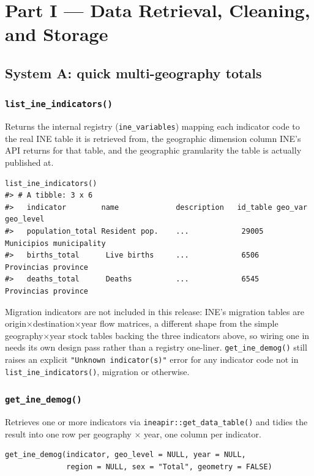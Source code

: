 \documentclass[11pt]{article}
\newcommand{\fn}[1]{\texttt{#1}}
\begin{document}
\newpage
\section{Part I --- Data Retrieval, Cleaning, and Storage}
\label{sec:part1}

\subsection{System A: quick multi-geography totals}

\subsubsection{\fn{list\_ine\_indicators()}}

Returns the internal registry (\fn{ine\_variables}) mapping each indicator
code to the real INE table it is retrieved from, the geographic dimension
column INE's API returns for that table, and the geographic granularity the
table is actually published at.

\begin{lstlisting}
list_ine_indicators()
#> # A tibble: 3 x 6
#>   indicator        name             description   id_table geo_var geo_level
#>   population_total Resident pop.    ...            29005    Municipios municipality
#>   births_total      Live births     ...            6506     Provincias province
#>   deaths_total      Deaths          ...            6545     Provincias province
\end{lstlisting}

Migration indicators are not included in this release: INE's migration
tables are origin$\times$destination$\times$year flow matrices, a different
shape from the simple geography$\times$year stock tables backing the three
indicators above, so wiring one in needs its own design pass rather than a
registry one-liner. \fn{get\_ine\_demog()} still raises an explicit
\fn{"Unknown indicator(s)"} error for any indicator code not in
\fn{list\_ine\_indicators()}, migration or otherwise.

\subsubsection{\fn{get\_ine\_demog()}}

Retrieves one or more indicators via \fn{ineapir::get\_data\_table()} and
tidies the result into one row per geography $\times$ year, one column per
indicator.

\begin{lstlisting}
get_ine_demog(indicator, geo_level = NULL, year = NULL,
              region = NULL, sex = "Total", geometry = FALSE)
\end{lstlisting}
\end{document}
